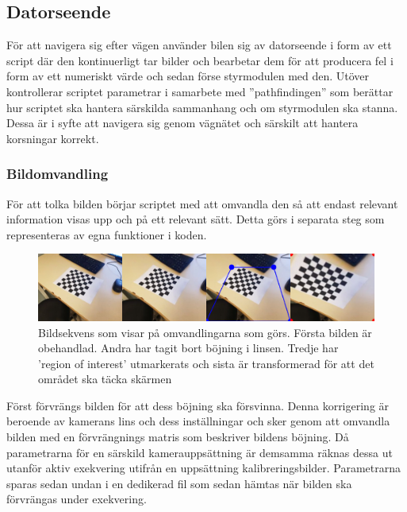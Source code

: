 \documentclass[10pt,oneside,swedish]{lips}
\begin{document}
\cleardoublepage

\subsection{Datorseende}
För att navigera sig efter vägen använder bilen sig av datorseende i form av ett script där den kontinuerligt tar bilder och bearbetar dem för att producera fel i form av ett numeriskt värde och sedan förse styrmodulen med den. Utöver kontrollerar scriptet parametrar i samarbete med ''pathfindingen'' som berättar hur scriptet ska hantera särskilda sammanhang och om styrmodulen ska stanna. Dessa är i syfte att navigera sig genom vägnätet och särskilt att hantera korsningar korrekt.

\subsubsection{Bildomvandling}
För att tolka bilden börjar scriptet med att omvandla den så att endast relevant information visas upp och på ett relevant sätt. Detta görs i separata steg som representeras av egna funktioner i koden.\\

\begin{figure}[htbp]
  \centering
  \includegraphics[width=1\textwidth]{./Figures/tekdok-conversion.png}
  \caption{Bildsekvens som visar på omvandlingarna som görs. Första bilden är obehandlad. Andra har tagit bort böjning i linsen. Tredje har 'region of interest' utmarkerats och sista är transformerad för att det området ska täcka skärmen}
  \label{fig:bildomvandling.png}
\end{figure}

\noindent
Först förvrängs bilden för att dess böjning ska försvinna. Denna korrigering är beroende av kamerans lins och dess inställningar och sker genom att omvandla bilden med en förvrängnings matris som beskriver bildens böjning. Då parametrarna för en särskild kamerauppsättning är demsamma räknas dessa ut utanför aktiv exekvering utifrån en uppsättning kalibreringsbilder. Parametrarna sparas sedan undan i en dedikerad fil som sedan hämtas när bilden ska förvrängas under exekvering.\\
\end{document}
